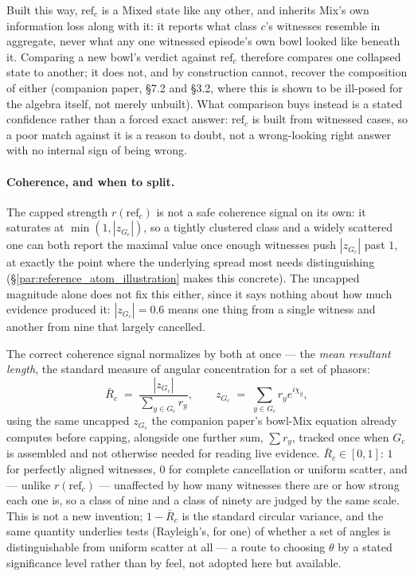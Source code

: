 \documentclass[12pt, a4paper]{article}
\begin{document}
Built this way, $\mathrm{ref}_c$ is a Mixed state like any other, and
inherits Mix's own information loss along with it: it reports what
class $c$'s witnesses resemble in aggregate, never what any one
witnessed episode's own bowl looked like beneath it. Comparing a new
bowl's verdict against $\mathrm{ref}_c$ therefore compares one
collapsed state to another; it does not, and by construction cannot,
recover the composition of either (companion paper, \S7.2 and \S3.2, where
this is shown to be ill-posed for the algebra itself, not merely
unbuilt). What comparison buys instead is a stated confidence rather
than a forced exact answer: $\mathrm{ref}_c$ is built from witnessed
cases, so a poor match against it is a reason to doubt, not a
wrong-looking right answer with no internal sign of being wrong.

\paragraph{Coherence, and when to split.}
The capped strength $r(\mathrm{ref}_c)$ is not a safe coherence
signal on its own: it saturates at $\min(1,|z_{G_c}|)$, so a tightly
clustered class and a widely scattered one can both report the
maximal value once enough witnesses push $|z_{G_c}|$ past $1$, at
exactly the point where the underlying spread most needs
distinguishing (\S\ref{par:reference_atom_illustration} makes this
concrete). The uncapped magnitude alone does not fix this either,
since it says nothing about how much evidence produced it: $|z_{G_c}|
= 0.6$ means one thing from a single witness and another from nine
that largely cancelled.

The correct coherence signal normalizes by both at once --- the
\emph{mean resultant length}, the standard measure of angular
concentration for a set of phasors:
\begin{equation}
    \bar R_c \;=\; \frac{|z_{G_c}|}{\sum_{y\in G_c} r_y},
    \qquad
    z_{G_c} \;=\; \sum_{y\in G_c} r_y e^{i\chi_y},
    \label{eq:coherence}
\end{equation}
using the same uncapped $z_{G_c}$ the companion paper's bowl-Mix
equation already computes before capping, alongside one further sum,
$\sum r_y$, tracked once when $G_c$ is assembled and not otherwise
needed for reading live evidence. $\bar R_c\in[0,1]$: $1$ for
perfectly aligned witnesses, $0$ for complete cancellation or uniform
scatter, and --- unlike $r(\mathrm{ref}_c)$ --- unaffected by how many
witnesses there are or how strong each one is, so a class of nine and
a class of ninety are judged by the same scale. This is not a new
invention; $1-\bar R_c$ is the standard circular variance, and the
same quantity underlies tests (Rayleigh's, for one) of whether a set
of angles is distinguishable from uniform scatter at all --- a route
to choosing $\theta$ by a stated significance level rather than by
feel, not adopted here but available.
\end{document}
